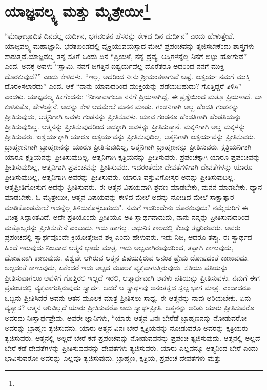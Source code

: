 
\chapter[ಯಾಜ್ಞವಲ್ಕ್ಯ ಮತ್ತು ಮೈತ್ರೇಯೀ]{ಯಾಜ್ಞವಲ್ಕ್ಯ ಮತ್ತು ಮೈತ್ರೇಯೀ\protect\footnote{}}

“ಮೇಘಾಚ್ಛಾದಿತ ದಿನವೆಲ್ಲ ದುರ್ದಿನ, ಭಗವಂತನ ಹೆಸರನ್ನು ಕೇಳದ ದಿನ ದುರ್ದಿನ'' ಎಂದು ಹೇಳುತ್ತೇವೆ. ಯಾಜ್ಞವಲ್ಕ್ಯ ಮಹಾಜ್ಞಾನಿ. ಭರತಖಂಡದಲ್ಲಿ ವ್ಯಕ್ತಿಯು\break ವಯಸ್ಸಾದ ಮೇಲೆ ಪ್ರಪಂಚವನ್ನು ತ್ಯಜಿಸಬೇಕೆಂದು ಶಾಸ್ತ್ರಗಳು ಸಾರುತ್ತವೆ.\break ಯಾಜ್ಞವಲ್ಕ್ಯ ತನ್ನ ಸತಿಗೆ ಒಂದು ದಿನ “ಪ್ರಿಯಳೆ, ನನ್ನ ದ್ರವ್ಯ, ಆಸ್ತಿಗಳನ್ನೆಲ್ಲ ನಿನಗೆ ಬಿಟ್ಟು ಹೋಗುವೆ'' ಎಂದ. ಅದಕ್ಕೆ ಅವಳು “ಸ್ವಾಮಿ, ನನಗೆ ಜಗತ್ತಿನ ಐಶ್ವರ್ಯವೆಲ್ಲ ದೊರೆತರೂ ಅದರಿಂದ ನನಗೆ ಮುಕ್ತಿ ದೊರಕುವುದೆ?'' ಎಂದು ಕೇಳಿದಳು. “ಇಲ್ಲ. ಅದರಿಂದ ನೀನು ಶ‍್ರೀಮಂತಳಾಗುವೆ ಅಷ್ಟೆ. ಐಶ್ವರ್ಯ ನಮಗೆ ಮುಕ್ತಿ ದೊರಕಿಸಲಾರದು'' ಎಂದ. ಆಕೆ “ನಾನು ಯಾವುದರಿಂದ ಮುಕ್ತಿಯನ್ನು ಪಡೆಯಬಹುದು? ಗೊತ್ತಿದ್ದರೆ ತಿಳಿಸಿ” ಎಂದಳು. ಯಾಜ್ಞವಲ್ಕ್ಯ ಹೀಗೆಂದನು: “ನೀನಾವಾಗಲೂ ನನಗೆ ಪ್ರಿಯಳಾಗಿದ್ದೆ. ಈ ಪ್ರಶ್ನೆಯಿಂದ ಮತ್ತೂ ಪ್ರಿಯಳಾದೆ. ಬಾ ಕುಳಿತುಕೊ, ಹೇಳುತ್ತೇನೆ. ಅದನ್ನು ಕೇಳಿ ಆದಮೇಲೆ ಮನನ ಮಾಡು. ಗಂಡನಿಗಾಗಿ ಅಲ್ಲ ಹೆಂಡತಿ ಗಂಡನನ್ನು ಪ್ರೀತಿಸುವುದು, ಆತ್ಮನಿಗಾಗಿ ಅವಳು ಗಂಡನನ್ನು ಪ್ರೀತಿಸುವಳು. ಯಾವ ಗಂಡನೂ ಹೆಂಡತಿಗಾಗಿ ಹೆಂಡತಿಯನ್ನು ಪ್ರೀತಿಸುವುದಿಲ್ಲ. ಆತ್ಮನನ್ನು ಪ್ರೀತಿಸುವುದರಿಂದ ಅದಕ್ಕಾಗಿ ಅವಳನ್ನು ಪ್ರೀತಿಸುತ್ತಾನೆ. ಮಕ್ಕಳಿಗಾಗಿ ಅಲ್ಲ ಮಕ್ಕಳನ್ನು ಪ್ರೀತಿಸುವರು. ಐಶ್ವರ್ಯಕ್ಕಾಗಿ ಯಾರೂ ಐಶ್ವರ್ಯವನ್ನು ಪ್ರೀತಿಸುವುದಿಲ್ಲ, ಆತ್ಮನಿಗಾಗಿ ಐಶ್ವರ್ಯವನ್ನು ಪ್ರೀತಿಸುವರು. ಬ್ರಾಹ್ಮಣನಿಗಾಗಿ ಬ್ರಾಹ್ಮಣನನ್ನು ಯಾರೂ ಪ್ರೀತಿಸುವುದಿಲ್ಲ, ಆತ್ಮನಿಗಾಗಿ ಬ್ರಾಹ್ಮಣನನ್ನು ಪ್ರೀತಿಸುವರು. ಕ್ಷತ್ರಿಯನಿಗಾಗಿ ಯಾರೂ ಕ್ಷತ್ರಿಯನನ್ನು ಪ್ರೀತಿಸುವುದಿಲ್ಲ, ಆತ್ಮನಿಗಾಗಿ ಕ್ಷತ್ರಿಯನನ್ನು ಪ್ರೀತಿಸುವರು. ಪ್ರಪಂಚಕ್ಕಾಗಿ ಯಾರೂ ಪ್ರಪಂಚವನ್ನು ಪ್ರೀತಿಸುವುದಿಲ್ಲ, ಆತ್ಮನಿಗಾಗಿ ಪ್ರಪಂಚವನ್ನು ಪ್ರೀತಿಸುವರು. ಇದರಂತೆಯೇ ದೇವತೆಗಳಿಗಾಗಿ ದೇವತೆಗಳನ್ನು ಯಾರೂ ಪ್ರೀತಿಸುವುದಿಲ್ಲ, ಆತ್ಮನಿಗಾಗಿ ಅವರನ್ನು ಪ್ರೀತಿಸುವರು. ಯಾರೂ ವಸ್ತುವಿಗೋಸ್ಕರ ಅದನ್ನು ಪ್ರೀತಿಸುವುದಿಲ್ಲ. ಆತ್ಮಪ್ರೀತಿಗೋಸುಗ ಅದನ್ನು ಪ್ರೀತಿಸುವರು. ಈ ಆತ್ಮನ ವಿಷಯವಾಗಿ ಶ್ರವಣ ಮಾಡಬೇಕು, ಮನನ ಮಾಡಬೇಕು, ಧ್ಯಾನ ಮಾಡಬೇಕು. ಓ ಮೈತ್ರೇಯೀ, ಆತ್ಮನ ವಿಷಯವನ್ನು ಕೇಳಿದ ಮೇಲೆ ಅದನ್ನು ನೋಡಿದ ಮೇಲೆ ಸಾಕ್ಷಾತ್ಕಾರ ಮಾಡಿಕೊಂಡಮೇಲೆ ಇದನ್ನೆಲ್ಲ ತಿಳಿದುಕೊಳ್ಳಬಹುದು". ನಮಗೆ ಇದರಿಂದೇನು ದೊರಕುವುದು? ನಮ್ಮೆದುರಿಗೆ ಈ ವಿಚಿತ್ರ ಸಿದ್ದಾಂತವಿದೆ. ಅದೇ ಪ್ರತಿಯೊಂದು ಪ್ರೀತಿಯೂ ಅತಿ ಸ್ವಾರ್ಥವಾದುದು, ನಾನು ನನ್ನನ್ನು ಪ್ರೀತಿಸುವುದರಿಂದ ಮತ್ತೊಬ್ಬರನ್ನು ಪ್ರೀತಿಸುತ್ತೇನೆ ಎಂಬುದು. ಇದು ಹಾಗಲ್ಲ. ಆಧುನಿಕ ಕಾಲದಲ್ಲಿ ಕೆಲವು ತಜ್ಞರಿರುವರು. ಅವರು ಪ್ರಪಂಚದಲ್ಲಿ ಸ್ವಾರ್ಥವೊಂದೇ ಕ್ರಿಯೋತ್ತೇಜನ ಶಕ್ತಿ ಎಂದು ಹೇಳುವರು. ಇದು ನಿಜ, ಆದರೂ ತಪ್ಪು. ಈ ಸ್ವಾರ್ಥದ ಹಿಂದೆ ಇರುವುದು ನಿಜವಾದ ಆತ್ಮನ ಛಾಯೆ ಮಾತ್ರ. ಇದು ಅಲ್ಪವಾಗಿರುವುದರಿಂದ, ತಪ್ಪಾಗಿ ಕಾಣುವುದು, ದೋಷವಾಗಿ ಕಾಣುವುದು. ವಿಶ್ವವೇ ಆಗಿರುವ ಆತ್ಮನ ವಿಷಯಕ್ಕಿರುವ ಅನಂತ ಪ್ರೇಮ ದೋಷದಂತೆ ಕಾಣುವುದು. ಅಲ್ಪದಂತೆ ಕಾಣುವುದು, ಏಕೆಂದರೆ ಇದು ಅಲ್ಪದ ಮೂಲಕ ವ್ಯಕ್ತವಾಗುತ್ತಿರುವುದು. ಸತಿಯು ಪತಿಯನ್ನು ಪ್ರೀತಿಸುವಾಗಲೂ ಅವಳಿಗೆ ಗೊತ್ತಿರಲಿ ಇಲ್ಲದೆ ಇರಲಿ, ಆತ್ಮಾರ್ಥವಾಗಿ ಅವಳು ಪತಿಯನ್ನು ಪ್ರೀತಿಸುವಳು. ನಮಗೆ ಈಗ ಪ್ರಪಂಚದಲ್ಲಿ ವ್ಯಕ್ತವಾಗುತ್ತಿರುವುದು ಸ್ವಾರ್ಥ. ಆದರೆ ಆ ಸ್ವಾರ್ಥವು ಅನಂತತ್ವದ ಸ್ವಲ್ಪ ಭಾಗ ಮಾತ್ರ. ಎಂದಾದರೂ ಒಬ್ಬನು ಪ್ರೀತಿಸಿದರೆ ಅವನು ಆತನ ಮೂಲಕ ಮಾತ್ರ ಪ್ರೀತಿಸಲು ಸಾಧ್ಯ. ಈ ಆತ್ಮನನ್ನು ನಾವು ಅರಿಯಬೇಕು. ಏನು ವ್ಯತ್ಯಾಸ? ಆತ್ಮನ ಅರಿವಿಲ್ಲದೆ ಯಾರು ಪ್ರೀತಿಸುವರೊ ಅದು ಸ್ವಾರ್ಥಪ್ರೀತಿ. ಆತ್ಮನನ್ನು ಅರಿತು ಯಾರು ಪ್ರೀತಿಸುವರೊ ಅವರದು ನಿಃಸ್ವಾರ್ಥಪ್ರೇಮ. ಅವರೇ ಜ್ಞಾನಿಗಳು, “ಯಾರು ಆತ್ಮನ ವಿನಃ ಬೇರೆಡೆ ಬ್ರಾಹ್ಮಣನನ್ನು ನೋಡುವರೋ ಅವರನ್ನು ಬ್ರಾಹ್ಮಣ ತ್ಯಜಿಸುವನು. ಯಾರು ಆತ್ಮನ ವಿನಃ ಬೇರೆ ಕ್ಷತ್ರಿಯನನ್ನು ನೋಡುವರೊ ಅವರನ್ನು ಕ್ಷತ್ರಿಯರು ತ್ಯಜಿಸುವರು. ಆತ್ಮನಲ್ಲಿ ಅಲ್ಲದೆ ಬೇರೆ ಕಡೆ ಪ್ರಪಂಚವನ್ನು ನೋಡುವವನನ್ನು ಪ್ರಪಂಚ ತ್ಯಜಿಸುವುದು. ಆತ್ಮನಲ್ಲಿ ಅಲ್ಲದೆ ಬೇರೆ ಕಡೆ ದೇವತೆಗಳನ್ನು ಪ್ರೀತಿಸುವವನನ್ನು ದೇವತೆಗಳು ತ್ಯಜಿಸುವರು. ಯಾರು ಎಲ್ಲವನ್ನೂ ಆತ್ಮನಿಂದ ಬೇರೆ ಎಂದು ಭಾವಿಸುವರೋ ಅವರನ್ನು ಎಲ್ಲವೂ ತ್ಯಜಿಸುವುದು. ಬ್ರಾಹ್ಮಣ, ಕ್ಷತ್ರಿಯ, ಪ್ರಪಂಚ ದೇವತೆಗಳು ಮತ್ತು 